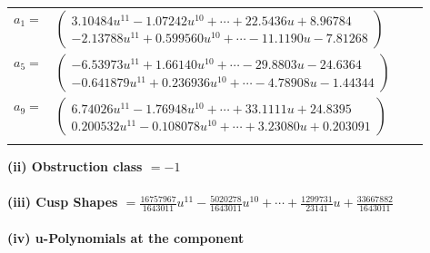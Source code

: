 \documentclass[1p]{elsarticle_modified}
\theoremstyle{definition}
\begin{document}
\begin{tabular}{m{7pt} m{180pt} m{7pt} m{180pt} }
\flushright $a_{1}=$&$\begin{pmatrix}3.10484 u^{11}-1.07242 u^{10}+\cdots+22.5436 u+8.96784\\-2.13788 u^{11}+0.599560 u^{10}+\cdots-11.1190 u-7.81268\end{pmatrix}$ \\
\flushright $a_{5}=$&$\begin{pmatrix}-6.53973 u^{11}+1.66140 u^{10}+\cdots-29.8803 u-24.6364\\-0.641879 u^{11}+0.236936 u^{10}+\cdots-4.78908 u-1.44344\end{pmatrix}$ \\
\flushright $a_{9}=$&$\begin{pmatrix}6.74026 u^{11}-1.76948 u^{10}+\cdots+33.1111 u+24.8395\\0.200532 u^{11}-0.108078 u^{10}+\cdots+3.23080 u+0.203091\end{pmatrix}$\\&\end{tabular}
\flushleft \textbf{(ii) Obstruction class $= -1$}\\~\\
\flushleft \textbf{(iii) Cusp Shapes $= \frac{16757967}{1643011} u^{11}-\frac{5020278}{1643011} u^{10}+\cdots+\frac{1299731}{23141} u+\frac{33667882}{1643011}$}\\~\\
\newpage\renewcommand{\arraystretch}{1}
\flushleft \textbf{(iv) u-Polynomials at the component}\newline \\
\end{document}
